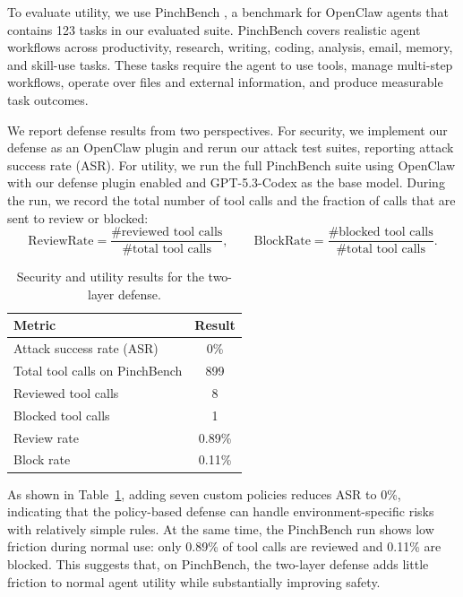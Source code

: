 \documentclass{article}
\begin{document}
To evaluate utility, we use PinchBench \citep{pinchbench2026skill}, a benchmark for OpenClaw agents that
contains 123 tasks in our evaluated suite. PinchBench covers realistic agent
workflows across productivity, research, writing, coding, analysis, email,
memory, and skill-use tasks. These tasks require the agent to use tools, manage
multi-step workflows, operate over files and external information, and produce
measurable task outcomes.

We report defense results from two perspectives. For security, we implement our
defense as an OpenClaw plugin and rerun our attack test suites, reporting attack
success rate (ASR). For utility, we run the full PinchBench suite using OpenClaw
with our defense plugin enabled and GPT-5.3-Codex as the base model. During the
run, we record the total number of tool calls and the fraction of calls that are
sent to review or blocked:
\[
\mathrm{ReviewRate} =
\frac{\#\text{reviewed tool calls}}{\#\text{total tool calls}},
\qquad
\mathrm{BlockRate} =
\frac{\#\text{blocked tool calls}}{\#\text{total tool calls}}.
\]

\begin{table}[H]
\centering
\small
\begin{tabular}{l c}
\hline
\textbf{Metric} & \textbf{Result} \\
\hline
Attack success rate (ASR) & 0\% \\
Total tool calls on PinchBench & 899 \\
Reviewed tool calls & 8 \\
Blocked tool calls & 1 \\
Review rate & 0.89\% \\
Block rate & 0.11\% \\
\hline
\end{tabular}
\caption{Security and utility results for the two-layer defense.}
\vspace{-1em}
\label{tab:defense-results}
\end{table}

As shown in Table~\ref{tab:defense-results},
adding seven custom policies reduces ASR to 0\%, indicating that the policy-based defense can handle environment-specific risks with relatively simple rules. At the
same time, the PinchBench run shows low friction during normal use: only
0.89\% of tool calls are reviewed and 0.11\% are blocked. This suggests that, on
PinchBench, the two-layer defense adds little friction to normal agent utility
while substantially improving safety.
\end{document}
